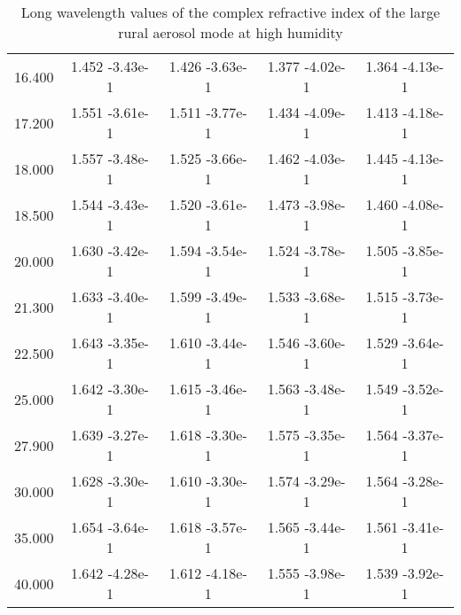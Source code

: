 \documentclass[12pt]{article}
\begin{document}
\begin{center}
\begin{table}
\begin{tabular}{| c | c | c | c | c |  }
16.400  &   1.452   -3.43e-1 &   1.426   -3.63e-1  &  1.377   -4.02e-1  &  1.364   -4.13e-1  \\
17.200  &   1.551   -3.61e-1  &  1.511   -3.77e-1 &   1.434   -4.09e-1 &   1.413   -4.18e-1  \\
18.000  &   1.557   -3.48e-1 &   1.525   -3.66e-1 &   1.462   -4.03e-1 &   1.445   -4.13e-1  \\
18.500  &   1.544   -3.43e-1 &   1.520   -3.61e-1 &   1.473   -3.98e-1 &   1.460   -4.08e-1  \\
20.000  &   1.630   -3.42e-1 &   1.594   -3.54e-1  &  1.524   -3.78e-1 &   1.505   -3.85e-1  \\
21.300  &   1.633   -3.40e-1  &  1.599   -3.49e-1 &   1.533   -3.68e-1 &   1.515   -3.73e-1  \\
22.500  &   1.643   -3.35e-1  &  1.610   -3.44e-1 &   1.546   -3.60e-1  &  1.529   -3.64e-1  \\
25.000  &   1.642   -3.30e-1  &  1.615   -3.46e-1 &   1.563   -3.48e-1  &  1.549   -3.52e-1  \\
27.900  &   1.639   -3.27e-1  &  1.618   -3.30e-1 &   1.575   -3.35e-1  &  1.564   -3.37e-1  \\
30.000  &   1.628   -3.30e-1 &   1.610   -3.30e-1 &   1.574   -3.29e-1  &  1.564   -3.28e-1  \\
35.000  &   1.654   -3.64e-1 &   1.618   -3.57e-1  &  1.565   -3.44e-1  &  1.561   -3.41e-1  \\
40.000  &   1.642   -4.28e-1 &   1.612   -4.18e-1  &  1.555   -3.98e-1  &  1.539   -3.92e-1 \\
\hline
\end{tabular}
\caption{Long wavelength values of the complex refractive index of the large rural aerosol mode at high humidity}
\end{table}
\end{center}



\newpage


\end{document}
